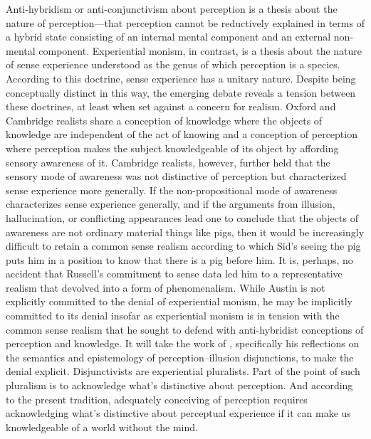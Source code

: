 Anti-hybridism or anti-conjunctivism about perception is a thesis about the nature of perception---that perception cannot be reductively explained in terms of a hybrid state consisting of an internal mental component and an external non-mental component. Experiential monism, in contrast, is a thesis about the nature of sense experience understood as the genus of which perception is a species. According to this doctrine, sense experience has a unitary nature. Despite being conceptually distinct in this way, the emerging debate reveals a tension between these doctrines, at least when set against a concern for realism. Oxford and Cambridge realists share a conception of knowledge where the objects of knowledge are independent of the act of knowing and a conception of perception where perception makes the subject knowledgeable of its object by affording sensory awareness of it. Cambridge realists, however, further held that the sensory mode of awareness was not distinctive of perception but characterized sense experience more generally. If the non-propositional mode of awareness characterizes sense experience generally, and if the arguments from illusion, hallucination, or conflicting appearances lead one to conclude that the objects of awareness are not ordinary material things like pigs, then it would be increasingly difficult to retain a common sense realism according to which Sid's seeing the pig puts him in a position to know that there is a pig before him. It is, perhaps, no accident that Russell's commitment to sense data led him to a representative realism that devolved into a form of phenomenalism. While Austin is not explicitly committed to the denial of experiential monism, he may be implicitly committed to its denial insofar as experiential monism is in tension with the common sense realism that he sought to defend with anti-hybridist conceptions of perception and knowledge. It will take the work of \citet{Hinton:1973js}, specifically his reflections on the semantics and epistemology of perception--illusion disjunctions, to make the denial explicit. Disjunctivists are experiential pluralists. Part of the point of such pluralism is to acknowledge what's distinctive about perception. And according to the present tradition, adequately conceiving of perception requires acknowledging what's distinctive about perceptual experience if it can make us knowledgeable of a world without the mind.


